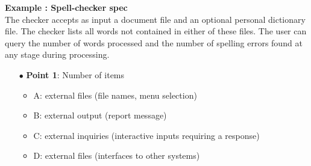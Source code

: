 \documentclass{article}
\begin{document}
\noindent \textbf{Example : Spell-checker spec} \\
The checker accepts as input a document file and an optional personal
dictionary file. The checker lists all words not contained in either of these files. The user can
query the number of words processed and the number of spelling errors found at any stage
during processing.
\begin{multicols}{2}
\begin{itemize}
    \item [$\bullet$]\textbf{Point 1}: Number of items
    \begin{itemize}
        \item  A: external files (file names, menu selection)
        \item B: external output (report message)

        \item  C: external inquiries (interactive inputs requiring a response)
        \item D: external files (interfaces to other systems)


\end{itemize}
\end{itemize}
\end{multicols}
\end{document}
